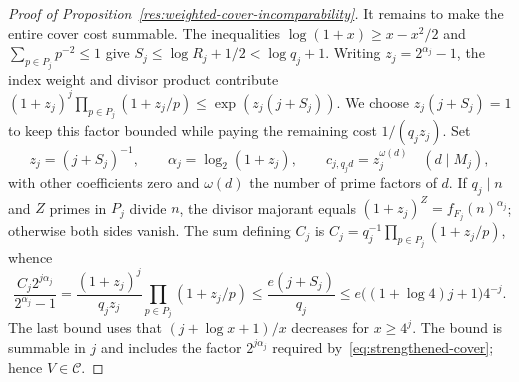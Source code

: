 \documentclass[11pt]{article}
\begin{document}
\begin{proof}[Proof of Proposition~\ref{res:weighted-cover-incomparability}]
It remains to make the entire cover cost summable. The inequalities
$\log(1+x)\ge x-x^2/2$ and $\sum_{p\in P_j}p^{-2}\le1$ give
$S_j\le\log R_j+1/2<\log q_j+1$. Writing
$z_j=2^{\alpha_j}-1$, the index weight and divisor product contribute
$(1+z_j)^j\prod_{p\in P_j}(1+z_j/p)\le\exp(z_j(j+S_j))$.
We choose $z_j(j+S_j)=1$ to keep this factor bounded while paying
the remaining cost $1/(q_jz_j)$.
Set
\[
 z_j=(j+S_j)^{-1},\qquad
 \alpha_j=\log_2(1+z_j),\qquad
 c_{j,q_jd}=z_j^{\omega(d)}\quad(d\mid M_j),
\]
with other coefficients zero and $\omega(d)$ the number of prime
factors of $d$.  If $q_j\mid n$ and $Z$ primes in $P_j$ divide $n$,
the divisor majorant equals $(1+z_j)^Z=f_{F_j}(n)^{\alpha_j}$;
otherwise both sides vanish. The sum defining $C_j$ is
$C_j=q_j^{-1}\prod_{p\in P_j}(1+z_j/p)$, whence
\[
 \frac{C_j2^{j\alpha_j}}{2^{\alpha_j}-1}
 =\frac{(1+z_j)^j}{q_jz_j}
    \prod_{p\in P_j}(1+z_j/p)
 \le\frac{e(j+S_j)}{q_j}
 \le e\bigl((1+\log4)j+1\bigr)4^{-j}.
\]
The last bound uses that $(j+\log x+1)/x$ decreases for $x\ge4^j$.
The bound is summable in $j$ and includes the factor $2^{j\alpha_j}$
required by~\eqref{eq:strengthened-cover}; hence $V\in\mathcal C$.
\end{proof}
\end{document}

